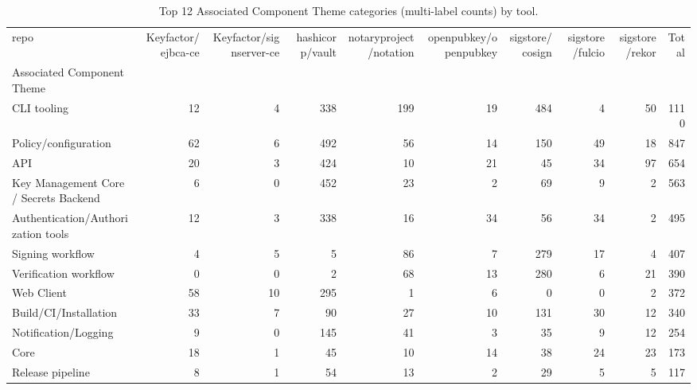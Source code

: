 \begin{table}[t]
\centering
\caption{Top 12 Associated Component Theme categories (multi-label counts) by tool.}
\label{tab:phase3-associated-component-theme}
\scriptsize
\begin{tabular}{lrrrrrrrrr}
\toprule
repo & Keyfactor/ejbca-ce & Keyfactor/signserver-ce & hashicorp/vault & notaryproject/notation & openpubkey/openpubkey & sigstore/cosign & sigstore/fulcio & sigstore/rekor & Total \\
Associated Component Theme &  &  &  &  &  &  &  &  &  \\
\midrule
CLI tooling & 12 & 4 & 338 & 199 & 19 & 484 & 4 & 50 & 1110 \\
Policy/configuration & 62 & 6 & 492 & 56 & 14 & 150 & 49 & 18 & 847 \\
API & 20 & 3 & 424 & 10 & 21 & 45 & 34 & 97 & 654 \\
Key Management Core / Secrets Backend & 6 & 0 & 452 & 23 & 2 & 69 & 9 & 2 & 563 \\
Authentication/Authorization tools & 12 & 3 & 338 & 16 & 34 & 56 & 34 & 2 & 495 \\
Signing workflow & 4 & 5 & 5 & 86 & 7 & 279 & 17 & 4 & 407 \\
Verification workflow & 0 & 0 & 2 & 68 & 13 & 280 & 6 & 21 & 390 \\
Web Client & 58 & 10 & 295 & 1 & 6 & 0 & 0 & 2 & 372 \\
Build/CI/Installation & 33 & 7 & 90 & 27 & 10 & 131 & 30 & 12 & 340 \\
Notification/Logging & 9 & 0 & 145 & 41 & 3 & 35 & 9 & 12 & 254 \\
Core & 18 & 1 & 45 & 10 & 14 & 38 & 24 & 23 & 173 \\
Release pipeline & 8 & 1 & 54 & 13 & 2 & 29 & 5 & 5 & 117 \\
\bottomrule
\end{tabular}

\end{table}
